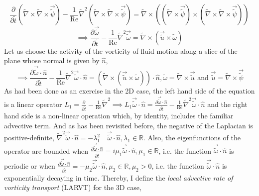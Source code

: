 \documentclass{article}
\begin{document}
\begin{equation*}
\frac{\partial}{\partial \tilde{t}}(\tilde{\nabla}\times\tilde{\nabla}\times\vec{\tilde{\psi}}) - \frac{1}{\operatorname{Re}} \tilde{\nabla}^2(\tilde{\nabla}\times\tilde{\nabla}\times\vec{\tilde{\psi}}) = \tilde{\nabla} \times ((\tilde{\nabla} \times \vec{\tilde{\psi}})\times(\tilde{\nabla} \times \tilde{\nabla} \times \vec{\tilde{\psi}}))
\end{equation*}
\begin{equation*}
\implies \frac{\partial\vec{\tilde{\omega}}}{\partial \tilde{t}} - \frac{1}{\operatorname{Re}} \tilde{\nabla}^2 \vec{\tilde{\omega}} = \tilde{\nabla} \times (\vec{\tilde{u}}\times \tilde{\omega})
\end{equation*}
Let us choose the activity of the vorticity of fluid motion along a slice of the plane whose normal is given by $\hat{n}$,
\begin{equation*}
\implies \frac{\partial\vec{\tilde{\omega}}\cdot \hat{n}}{\partial \tilde{t}} - \frac{1}{\operatorname{Re}} \tilde{\nabla}^2 \vec{\tilde{\omega}} \cdot \hat{n} = (\tilde{\nabla} \times (\vec{\tilde{u}}\times \tilde{\omega})) \cdot \hat{n}, \tilde{\omega} = \tilde{\nabla} \times \vec{\tilde{u}} \text{ and }  \vec{\tilde{u}} = \tilde{\nabla} \times \vec{\tilde{\psi}}
\end{equation*}
As had been done as an exercise in the 2D case, the left hand side of the equation is a linear operator $L_1 = \frac{\partial}{\partial \tilde{t}} - \frac{1}{\operatorname{Re}} \tilde{\nabla}^2 \implies L_1 \vec{\tilde{\omega}} \cdot \hat{n}  = \frac{\partial\vec{\tilde{\omega}}\cdot \hat{n}}{\partial \tilde{t}} - \frac{1}{\operatorname{Re}} \tilde{\nabla}^2 \vec{\tilde{\omega}} \cdot \hat{n}$ and the right hand side is a non-linear operation which, by identity, includes the familiar advective term. And as has been revisited before, the negative of the Laplacian is positive-definite, $\tilde{\nabla}^2 \vec{\tilde{\omega}} \cdot \hat{n} = -\lambda_1^2 \quad \vec{\tilde{\omega}} \cdot \hat{n}, \lambda_1 \in \mathbb{R}$. Also, the eigenfunctions of the operator are bounded when $\frac{\partial\vec{\tilde{\omega}}\cdot \hat{n}}{\partial \tilde{t}} = i\mu_1 \vec{\tilde{\omega}}\cdot \hat{n}, \mu_1 \in \mathbb{R}$, i.e. the function $\vec{\tilde{\omega}}\cdot \hat{n}$ is periodic or when $\frac{\partial\vec{\tilde{\omega}}\cdot \hat{n}}{\partial \tilde{t}} = -\mu_2 \vec{\tilde{\omega}}\cdot \hat{n}, \mu_2 \in \mathbb{R}, \mu_2 > 0$, i.e. the function $\vec{\tilde{\omega}}\cdot \hat{n}$ is exponentially decaying in time. Thereby, I define the \textit{local advective rate of vorticity transport} (LARVT) for the 3D case,
\end{document}
